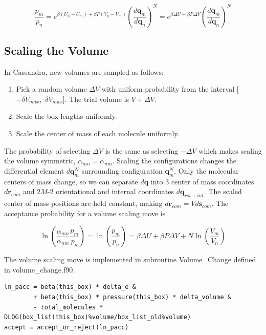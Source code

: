 \begin{equation}
\label{eq:pNPT_ratio}
\frac{p_m}{p_n} = e^{\beta (U_n - U_m) + \beta P (V_n - V_m)} \left(\frac{d\mathbf{q}_m}{d\mathbf{q}_n}\right)^N = e^{\beta \Delta U + \beta P \Delta V} \left(\frac{d\mathbf{q}_m}{d\mathbf{q}_n}\right)^N
\end{equation}

\subsection{Scaling the Volume}
In Cassandra, new volumes are sampled as follows:

\begin{enumerate}
	\item Pick a random volume $\Delta V$ with uniform probability from the interval [$-\delta V_{max}$,\ $\delta V_{max}$]. The trial volume is $V + \Delta V$.
	\item Scale the box lengths uniformly.
	\item Scale the center of mass of each molecule uniformly.
\end{enumerate}

The probability of selecting $\Delta V$ is the same as selecting $-\Delta V$ which makes scaling the volume symmetric, $\alpha_{mn}=\alpha_{nm}$. Scaling the configurations changes the differential element $d\mathbf{q}_m^N$ surrounding configuration $\mathbf{q}_m^N$. Only the molecular centers of mass change, so we can separate $d\mathbf{q}$ into 3 center of mass coordinates $d\mathbf{r}_{com}$ and 2$M$-2 orientational and internal coordinates $d\mathbf{q}_{rot+int}$. The scaled center of mass positions are held constant, making $d\mathbf{r}_{com} = V d\mathbf{s}_{com}$. The acceptance probability for a volume scaling move is

\begin{equation}
\label{eq:pAcc_volume}
\ln \left( \frac{\alpha_{mn}}{\alpha_{nm}} \frac{p_m}{p_n} \right) = \ln \left( \frac{p_m}{p_n} \right) = \beta \Delta U + \beta P \Delta V + N \ln\left(\frac{V_m}{V_n}\right)
\end{equation}

The volume scaling move is implemented in subroutine Volume\_Change defined in volume\_change.f90. 

\begin{lstlisting}[firstnumber=475, caption=volume\_change.f90, label=code:volume]
ln_pacc = beta(this_box) * delta_e &
        + beta(this_box) * pressure(this_box) * delta_volume &
        - total_molecules * DLOG(box_list(this_box)%volume/box_list_old%volume)
accept = accept_or_reject(ln_pacc)
\end{lstlisting}

